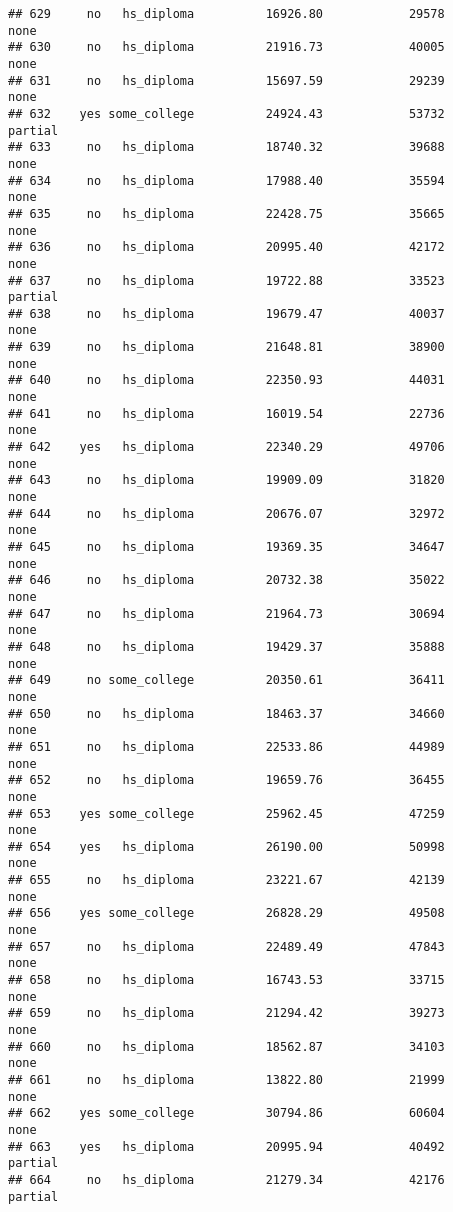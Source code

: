 \documentclass[
]{article}
\begin{document}
\begin{verbatim}
## 629     no   hs_diploma          16926.80            29578        none
## 630     no   hs_diploma          21916.73            40005        none
## 631     no   hs_diploma          15697.59            29239        none
## 632    yes some_college          24924.43            53732     partial
## 633     no   hs_diploma          18740.32            39688        none
## 634     no   hs_diploma          17988.40            35594        none
## 635     no   hs_diploma          22428.75            35665        none
## 636     no   hs_diploma          20995.40            42172        none
## 637     no   hs_diploma          19722.88            33523     partial
## 638     no   hs_diploma          19679.47            40037        none
## 639     no   hs_diploma          21648.81            38900        none
## 640     no   hs_diploma          22350.93            44031        none
## 641     no   hs_diploma          16019.54            22736        none
## 642    yes   hs_diploma          22340.29            49706        none
## 643     no   hs_diploma          19909.09            31820        none
## 644     no   hs_diploma          20676.07            32972        none
## 645     no   hs_diploma          19369.35            34647        none
## 646     no   hs_diploma          20732.38            35022        none
## 647     no   hs_diploma          21964.73            30694        none
## 648     no   hs_diploma          19429.37            35888        none
## 649     no some_college          20350.61            36411        none
## 650     no   hs_diploma          18463.37            34660        none
## 651     no   hs_diploma          22533.86            44989        none
## 652     no   hs_diploma          19659.76            36455        none
## 653    yes some_college          25962.45            47259        none
## 654    yes   hs_diploma          26190.00            50998        none
## 655     no   hs_diploma          23221.67            42139        none
## 656    yes some_college          26828.29            49508        none
## 657     no   hs_diploma          22489.49            47843        none
## 658     no   hs_diploma          16743.53            33715        none
## 659     no   hs_diploma          21294.42            39273        none
## 660     no   hs_diploma          18562.87            34103        none
## 661     no   hs_diploma          13822.80            21999        none
## 662    yes some_college          30794.86            60604        none
## 663    yes   hs_diploma          20995.94            40492     partial
## 664     no   hs_diploma          21279.34            42176     partial

\end{verbatim}
\end{document}
